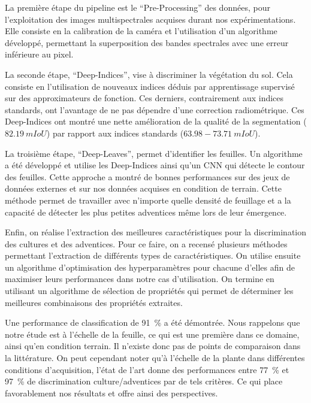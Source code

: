\documentclass[../thesis.tex]{subfiles}
\begin{document}
    La première étape du pipeline est le ``Pre-Processing'' des données, pour l'exploitation des images multispectrales acquises durant nos expérimentations. Elle consiste en la calibration de la caméra et l'utilisation d'un algorithme développé, permettant la superposition des bandes spectrales avec une erreur inférieure au pixel.
    
    La seconde étape, ``Deep-Indices'', vise à discriminer la végétation du sol. Cela consiste en l'utilisation de nouveaux indices déduis par apprentissage supervisé sur des approximateurs de fonction. Ces derniers, contrairement aux indices standards, ont l'avantage de ne pas dépendre d'une correction radiométrique. Ces Deep-Indices ont montré une nette amélioration de la qualité de la segmentation ($\SI{82.19}{mIoU}$) par rapport aux indices standards ($63.98-\SI{73.71}{mIoU}$).
    
    La troisième étape, ``Deep-Leaves'', permet d'identifier les feuilles. Un algorithme a été développé et utilise les Deep-Indices ainsi qu'un CNN qui détecte le contour des feuilles. Cette approche a montré de bonnes performances sur des jeux de données externes et sur nos données acquises en condition de terrain. Cette méthode permet de travailler avec n'importe quelle densité de feuillage et a la capacité de détecter les plus petites adventices même lors de leur émergence. %
    
    
    Enfin, on réalise l'extraction des meilleures caractéristiques pour la discrimination des cultures et des adventices. Pour ce faire, on a recensé plusieurs méthodes permettant l'extraction de différents types de caractéristiques. On utilise ensuite un algorithme d'optimisation des hyperparamètres pour chacune d'elles afin de maximiser leurs performances dans notre cas d'utilisation. On termine en utilisant un algorithme de sélection de propriétés qui permet de déterminer les meilleures combinaisons des propriétés extraites.
    
    Une performance de classification de \SI{91}{\percent} a été démontrée. Nous rappelons que notre étude est à l'échelle de la feuille, ce qui est une première dans ce domaine, ainsi qu'en condition terrain. Il n'existe donc pas de points de comparaison dans la littérature. On peut cependant noter qu'à l'échelle de la plante dans différentes conditions d'acquisition, l'état de l'art \cite{Ahmed2016} donne des performances entre \SI{77}{\percent} et \SI{97}{\percent} de discrimination culture/adventices par de tels critères. Ce qui place favorablement nos résultats et offre ainsi des perspectives.
    
\end{document}
